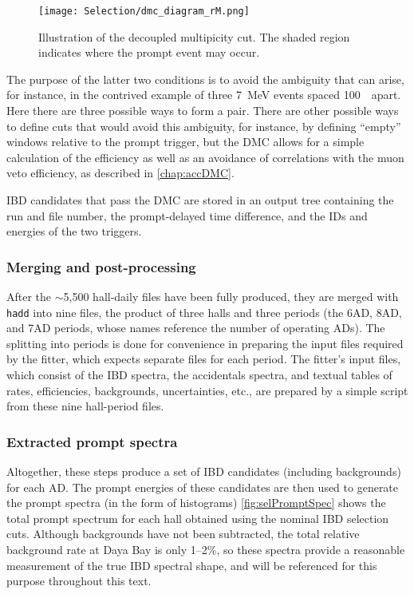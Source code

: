 \documentclass[../thesis.tex]{subfiles}
\begin{document}
\begin{figure}[h]
  \texttt{[image: Selection/dmc\_diagram\_rM.png]}
  \caption{Illustration of the decoupled multipicity cut. The shaded region indicates where the prompt event may occur.}
  \label{fig:dmc_diagram_rM}
\end{figure}

The purpose of the latter two conditions is to avoid the ambiguity that can arise, for instance, in the contrived example of three 7~MeV events spaced 100~\us\ apart. Here there are three possible ways to form a pair. There are other possible ways to define cuts that would avoid this ambiguity, for instance, by defining ``empty'' windows relative to the prompt trigger, but the DMC allows for a simple calculation of the efficiency as well as an avoidance of correlations with the muon veto efficiency, as described in \autoref{chap:accDMC}.

IBD candidates that pass the DMC are stored in an output tree containing the run and file number, the prompt-delayed time difference, and the IDs and energies of the two triggers.

\subsubsection{Merging and post-processing}
\label{sec:selMergingTwo}

After the $\sim$5,500 hall-daily files have been fully produced, they are merged with \texttt{hadd} into nine files, the product of three halls and three periods (the 6AD, 8AD, and 7AD periods, whose names reference the number of operating ADs). The splitting into periods is done for convenience in preparing the input files required by the fitter, which expects separate files for each period. The fitter's input files, which consist of the IBD spectra, the accidentals spectra, and textual tables of rates, efficiencies, backgrounds, uncertainties, etc., are prepared by a simple script from these nine hall-period files.

\subsubsection{Extracted prompt spectra}
\label{sec:selPromptSpec}

Altogether, these steps produce a set of IBD candidates (including backgrounds) for each AD. The prompt energies of these candidates are then used to generate the prompt spectra (in the form of histograms) \autoref{fig:selPromptSpec} shows the total prompt spectrum for each hall obtained using the nominal IBD selection cuts. Although backgrounds have not been subtracted, the total relative background rate at Daya Bay is only 1--2\%, so these spectra provide a reasonable measurement of the true IBD spectral shape, and will be referenced for this purpose throughout this text.
\end{document}

